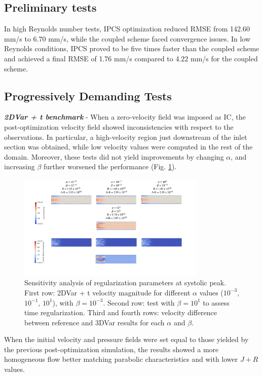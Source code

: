 \subsection*{Preliminary tests}
In high Reynolds number tests, IPCS optimization reduced RMSE from 142.60 mm/s to 6.70 mm/s, while the coupled scheme faced convergence issues. In low Reynolds conditions, IPCS proved to be five times faster than the coupled scheme and achieved a final RMSE of 1.76 mm/s compared to 4.22 mm/s for the coupled scheme.

\subsection*{Progressively Demanding Tests}
\textbf{\textit{2DVar + t benchmark}} - When a zero-velocity field was imposed as IC, the post-optimization velocity field showed inconsistencies with respect to the observations.
In particular, a high-velocity region just downstream of the inlet section was obtained, while low velocity values were computed in the rest of the domain.
Moreover, these tests did not yield improvements by changing \(\alpha\), and increasing \(\beta\) further worsened the performance (Fig. \ref{fig:3.3}).

\begin{figure}
    \centering
    \includegraphics[width=0.8\textwidth, height = 0.3\textheight]{chapters/paratico/Fig1.2.pdf}
    \caption{Sensitivity analysis of regularization parameters at systolic peak. First row: 2DVar + t velocity magnitude for different $\alpha$ values ($10^{-3}$, $10^{-1}$, $10^{1}$), with $\beta = 10^{-3}$. Second row: test with $\beta = 10^{1}$ to assess time regularization. Third and fourth rows: velocity difference between reference and 3DVar results for each $\alpha$ and $\beta$.}
    \label{fig:3.3}
\end{figure}

When the initial velocity and pressure fields were set equal to those yielded by the previous post-optimization simulation, the results showed a more homogeneous flow better matching parabolic characteristics and with lower \(J + R\) values.\\

